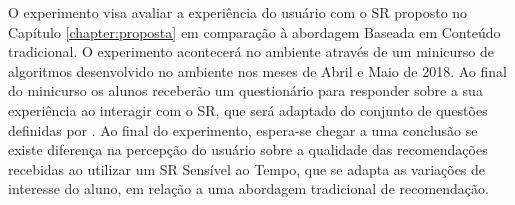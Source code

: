 O experimento visa avaliar a experiência do usuário com o SR proposto no Capítulo \ref{chapter:proposta} em
comparação à abordagem Baseada em Conteúdo tradicional. O experimento acontecerá no ambiente
\adaptweb através de um minicurso de algoritmos desenvolvido no ambiente nos meses de
Abril e Maio de 2018. Ao final do minicurso os alunos receberão um questionário para responder sobre a sua experiência
ao interagir com o SR, que será adaptado do conjunto de questões definidas por . Ao final do
experimento, espera-se chegar a uma conclusão se existe diferença na percepção do usuário sobre a qualidade
das recomendações recebidas ao utilizar um SR Sensível ao Tempo, que se adapta as variações de interesse do
aluno, em relação a uma abordagem tradicional de recomendação.
